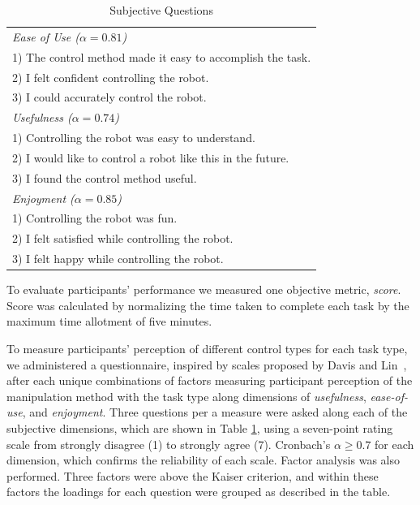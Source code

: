 \documentclass{sigchi}
\begin{document}
 \begin{table}[t]
\centering
\caption{Subjective Questions}
\begin{tabular}{|p{\columnwidth}|}
\hline
\em{Ease of Use} ($\alpha = 0.81$) \\
1) The control method made it easy to accomplish the task. \\
2) I felt confident controlling the robot. \\
3) I could accurately control the robot. \\
\hline
\em{Usefulness} ($\alpha = 0.74$) \\
1) Controlling the robot was easy to understand. \\
2) I would like to control a robot like this in the future. \\
3) I found the control method useful. \\
\hline
\em{Enjoyment} ($\alpha = 0.85$) \\
1) Controlling the robot was fun. \\
2) I felt satisfied while controlling the robot. \\
3) I felt happy while controlling the robot. \\
\hline
\end{tabular}
\label{tab:subjective}
 \end{table}

To evaluate participants' performance we measured one objective metric, \textit{score}. Score was calculated by normalizing the time taken to complete each task by the maximum time allotment of five minutes.

To measure participants' perception of different control types for each task type, we administered a questionnaire, inspired by scales proposed by Davis and Lin~\cite{Davis1989, Lin2008}, after each unique combinations of factors measuring participant perception of the manipulation method with the task type along dimensions of \textit{usefulness}, \textit{ease-of-use}, and \textit{enjoyment}. Three questions per a measure were asked along each of the subjective dimensions, which are shown in Table \ref{tab:subjective}, using a seven-point rating scale from strongly disagree (1) to strongly agree (7). Cronbach's $\alpha\geq0.7$ for each dimension, which confirms the reliability of each scale. Factor analysis was also performed. Three factors were above the Kaiser criterion, and within these factors the loadings for each question were grouped as described in the table.

\end{document}
